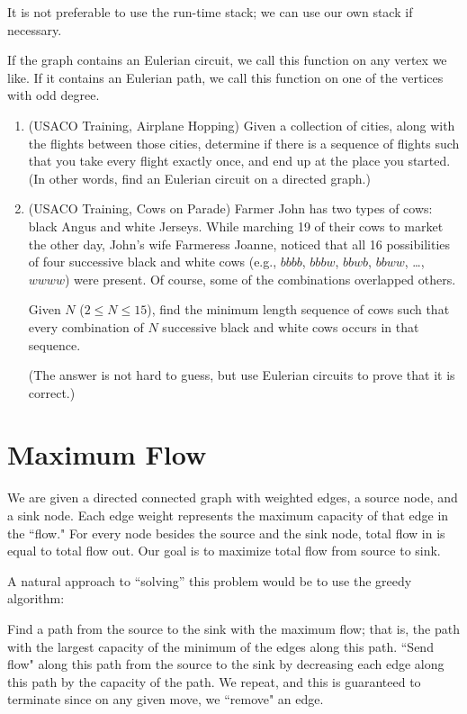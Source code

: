 \documentclass[11pt]{book}
\begin{document}
It is not preferable to use the run-time stack; we can use our own stack if necessary.

If the graph contains an Eulerian circuit, we call this function on any vertex we like. If it contains an Eulerian path, we call this function on one of the vertices with odd degree.

\begin{enumerate}

\item
(USACO Training, Airplane Hopping)
Given a collection of cities, along with the flights between those cities, determine if there is a sequence of flights such that you take every flight exactly once, and end up at the place you started. (In other words, find an Eulerian circuit on a directed graph.)

\item
(USACO Training, Cows on Parade)
Farmer John has two types of cows: black Angus and white Jerseys. While marching 19 of their cows to market the other day, John's wife Farmeress Joanne, noticed that all 16 possibilities of four successive black and white cows (e.g., $bbbb$, $bbbw$, $bbwb$, $bbww$, \ldots, $wwww$) were present. Of course, some of the combinations overlapped others.

Given $N$ ($2 \le N \le 15$), find the minimum length sequence of cows such that every combination of $N$ successive black and white cows occurs in that sequence.

(The answer is not hard to guess, but use Eulerian circuits to prove that it is correct.)

\end{enumerate}

\section{Maximum Flow}

We are given a directed connected graph with weighted edges, a source node, and a sink node. Each edge weight represents the maximum capacity of that edge in the ``flow." For every node besides the source and the sink node, total flow in is equal to total flow out. Our goal is to maximize total flow from source to sink.

A natural approach to ``solving'' this problem would be to use the greedy algorithm:

Find a path from the source to the sink with the maximum flow; that is, the path with the largest capacity of the minimum of the edges along this path. ``Send flow" along this path from the source to the sink by decreasing each edge along this path by the capacity of the path. We repeat, and this is guaranteed to terminate since on any given move, we ``remove" an edge.
\end{document}
